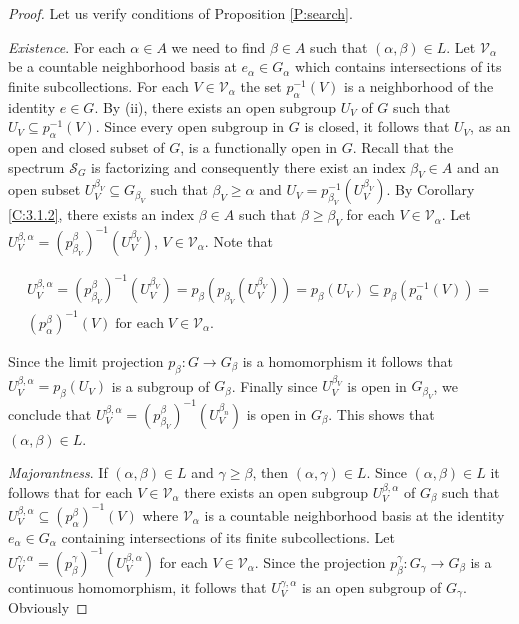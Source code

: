 \documentclass[12pt,draft]{amsart}
\theoremstyle{plain}
\theoremstyle{definition}
\numberwithin{equation}{section}
\begin{document}
\begin{proof}
Let us verify conditions of Proposition \ref{P:search}.

{\em Existence}.
For each $\alpha \in A$ we need to find
$\beta \in A$  such that  $(\alpha ,\beta ) \in L$.
Let ${\mathcal V}_{\alpha}$ be a countable
neighborhood basis at $e_{\alpha} \in G_{\alpha}$ which contains
intersections of its finite subcollections. For each $V \in {\mathcal V}_{\alpha}$
the set $p_{\alpha}^{-1}\left( V\right)$ is a
neighborhood of the identity $e \in G$. By (ii), there exists an
open subgroup $U_{V}$ of $G$ such that
$U_{V} \subseteq p_{\alpha}^{-1}\left( V\right)$.
Since every open subgroup in $G$ is closed, it follows that $U_{V}$, as
an open and closed subset of $G$, is a functionally open in $G$.
Recall that the spectrum
${\mathcal S}_{G}$
is factorizing and consequently there exist an index
$\beta_{V} \in A$ and an
open subset $U_{V}^{\beta_{V}} \subseteq G_{\beta_{V}}$ such
that $\beta_{V} \geq \alpha$
and $U_{V} = p_{\beta_{V}}^{-1}\left( U_{V}^{\beta_{V}}\right)$.
By Corollary \ref{C:3.1.2}, there exists an index $\beta \in A$ such that
$\beta \geq \beta_{V}$ for each $V \in {\mathcal V}_{\alpha}$.
Let $U_{V}^{\beta ,\alpha} = \left( p_{\beta_{V}}^{\beta}\right)^{-1}\left( U_{V}^{\beta_{V}}\right)$,
$V \in {\mathcal V}_{\alpha}$. Note that

\begin{multline*}
U_{V}^{\beta ,\alpha} =
\left( p_{\beta_{V}}^{\beta}\right)^{-1}\left( U_{V}^{\beta_{V}}\right)
= p_{\beta}\left( p_{\beta_{V}}\left( U_{V}^{\beta_{V}}\right)\right)
= p_{\beta}(U_{V})
\subseteq p_{\beta}\left( p_{\alpha}^{-1}(V)\right) =\\
 \left( p_{\alpha}^{\beta}\right)^{-1}(V)
\;\text{for each}\; V \in {\mathcal V}_{\alpha} .
\end{multline*}

\noindent Since the limit projection $p_{\beta} \colon G \to G_{\beta}$ is a
homomorphism it follows that $U_{V}^{\beta ,\alpha} = p_{\beta}(U_{V})$
is a subgroup of $G_{\beta}$. Finally since $U_{V}^{\beta_{V}}$
is open in $G_{\beta_{V}}$, we conclude that $U_{V}^{\beta ,\alpha} = \left( p_{\beta_{V}}^{\beta}\right)^{-1}\left( U_{V}^{\beta_{n}}\right)$
is open in $G_{\beta}$. This shows that $(\alpha ,\beta ) \in L$.


{\em Majorantness}.
If  $(\alpha ,\beta ) \in L$  and
$\gamma \geq \beta$, then  $(\alpha ,\gamma ) \in L$.
Since $(\alpha ,\beta ) \in L$ it follows that for each
$V \in {\mathcal V}_{\alpha}$ there exists an open subgroup $U_{V}^{\beta ,\alpha}$
of $G_{\beta}$ such that
$U_{V}^{\beta ,\alpha} \subseteq \left( p_{\alpha}^{\beta}\right)^{-1}
(V)$ where
${\mathcal V}_{\alpha}$ is a countable
neighborhood basis at the identity $e_{\alpha} \in G_{\alpha}$
containing intersections of its finite subcollections.
Let $U_{V}^{\gamma ,\alpha} =
\left( p_{\beta}^{\gamma}\right)^{-1}(U_{V}^{\beta ,\alpha})$ for
each $V \in {\mathcal V}_{\alpha}$. Since the projection
$p_{\beta}^{\gamma} \colon G_{\gamma} \to G_{\beta}$ is a
continuous homomorphism, it follows that $U_{V}^{\gamma ,\alpha}$ is an
open subgroup of $G_{\gamma}$. Obviously 


\end{proof}
\end{document}
